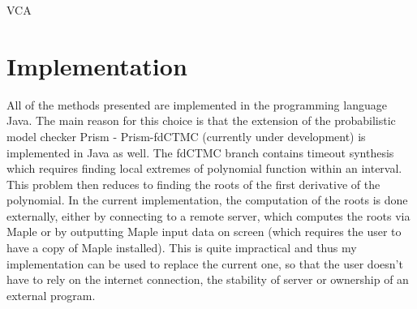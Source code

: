 \documentclass[
  digital, %
  notable,   %
  nolof,     %
  nolot,     %
	draft, %
]{fithesis3}
\begin{document}
\begin{algorithm}
  \caption{VCA
    \label{alg:vca}}
  \begin{algorithmic}[1]
    \Statex
				\State\Return{$\emptyset$}
			\EndIf
				\State{}
			\EndIf
				\State{}
			\EndIf
				\State{}
			\Else
				\State{}
			\EndIf
    \EndFunction
  \end{algorithmic}
\end{algorithm}

\chapter{Implementation}
All of the methods presented are implemented in the programming language Java. The main reason for this choice is that the extension of the probabilistic model checker Prism \parencite{KNP11} - Prism-fdCTMC (currently under development) is implemented in Java as well. The fdCTMC branch contains timeout synthesis \parencite{DBLP:conf/mascots/KorenciakKR16} which requires finding local extremes of polynomial function within an interval. This problem then reduces to finding the roots of the first derivative of the polynomial. In the current implementation, the computation of the roots is done externally, either by connecting to a remote server, which computes the roots via Maple or by outputting Maple input data on screen (which requires the user to have a copy of Maple installed). This is quite impractical and thus my implementation can be used to replace the current one, so that the user doesn't have to rely on the internet connection, the stability of server or ownership of an external program.
\end{document}
